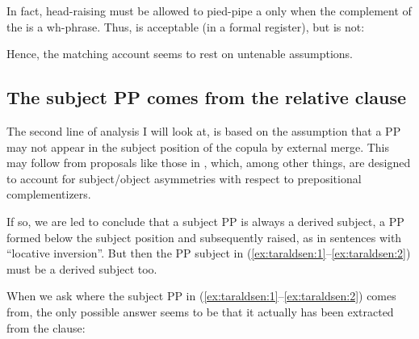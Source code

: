 \documentclass[output=paper]{LSP/langsci}
\begin{document}
\ea%
    \label{ex:taraldsen:30}
\z\z

In fact, head-raising must be allowed to pied-pipe a  only when the complement of the  is a wh-phrase. Thus,  is acceptable (in a formal register), but  is not:

\ea%
    \label{ex:taraldsen:31}
\z\z

Hence, the matching account seems to rest on untenable assumptions.

\subsection{The subject PP comes from the relative clause}\label{sec:taraldsen:3.2}

The second line of analysis I will look at, is based on the assumption that a PP may not appear in the subject position of the copula by external merge. This may follow from proposals like those in \citet[282--313]{Kayne1999}, which, among other things, are designed to account for subject/object asymmetries with respect to prepositional complementizers.

If so, we are led to conclude that a subject PP is always a derived subject, a PP formed below the subject position and subsequently raised, as in sentences with  “locative inversion”. But then the PP subject in (\ref{ex:taraldsen:1}--\ref{ex:taraldsen:2}) must be a derived subject too.

When we ask where the subject PP in (\ref{ex:taraldsen:1}--\ref{ex:taraldsen:2}) comes from, the only possible answer seems to be that it actually has been extracted from the  clause:
\end{document}
